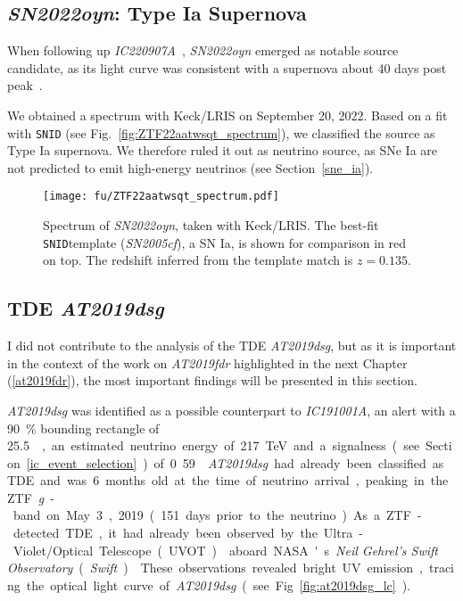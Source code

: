 \pagebreak

\subsection{\textit{SN2022oyn}: Type Ia Supernova}
When following up \emph{IC220907A}~, \emph{SN2022oyn} emerged as notable source candidate, as its light curve was consistent with a supernova about 40 days post peak~.

We obtained a spectrum with Keck/LRIS on September 20, 2022. Based on a fit with \texttt{SNID} (see Fig.~\ref{fig:ZTF22aatwsqt_spectrum}), we classified the source as Type Ia supernova. We therefore ruled it out as neutrino source, as SNe Ia are not predicted to emit high-energy neutrinos (see Section~\ref{sne_ia}).

\begin{figure}[htb]
    \texttt{[image: fu/ZTF22aatwsqt\_spectrum.pdf]}
    \caption[\emph{SN2022oyn} spectrum]{Spectrum of \emph{SN2022oyn}, taken with Keck/LRIS. The best-fit \texttt{SNID}template (\emph{SN2005cf}), a SN Ia, is shown for comparison in red on top. The redshift inferred from the template match is $z=0.135$.}
\end{figure}

\subsection{TDE \emph{AT2019dsg}}\label{at2019dsg}
I did not contribute to the analysis of the TDE \emph{AT2019dsg}, but as it is important in the context of the work on \emph{AT2019fdr} highlighted in the next Chapter (\ref{at2019fdr}), the most important findings will be presented in this section.

\emph{AT2019dsg} was identified as a possible counterpart to \emph{IC191001A}, an alert with a \SI{90}{\percent} bounding rectangle of \SI{25.5}{\square\deg}, an estimated neutrino energy of \SI{217}{\tera\eV} and a signalness (see Section~\ref{ic_event_selection}) of 0.59~.

\emph{AT2019dsg} had already been classified as TDE and was 6 months old at the time of neutrino arrival, peaking in the ZTF \textit{g}-band on May 3, 2019 (151 days prior to the neutrino). As a ZTF-detected TDE, it had already been observed by the Ultra-Violet/Optical Telescope (UVOT)~ aboard NASA's \textit{Neil Gehrel's Swift Observatory} (\textit{Swift})~. These observations revealed bright UV emission, tracing the optical light curve of \emph{AT2019dsg} (see Fig.~\ref{fig:at2019dsg_lc}).

